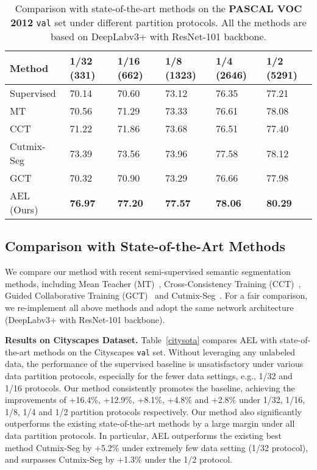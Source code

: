 \begin{table*}[t]
\renewcommand\arraystretch{1.1}
\begin{center}
\caption{Comparison with state-of-the-art methods on the \textbf{PASCAL VOC 2012} \texttt{val} set under different partition protocols. All the methods are based on DeepLabv3+ with ResNet-101 backbone.}
\label{vocsota}
\begin{tabularx}{14cm}{p{2.5cm}|X<{\centering}| X<{\centering}| X<{\centering} | X<{\centering}|X<{\centering}}
\toprule
Method & 1/32 (331) & 1/16 (662) & 1/8 (1323) & 1/4 (2646) & 1/2 (5291)  \\
\midrule
Supervised  & 70.14 & 70.60 & 73.12 & 76.35 & 77.21\\
\midrule
MT~\cite{TarvainenV17}    & 70.56 & 71.29 & 73.33 & 76.61 & 78.08 \\
CCT~\cite{OualiHT20}    & 71.22 & 71.86 & 73.68 & 76.51 & 77.40 \\
Cutmix-Seg~\cite{FrenchLAMF20}   & 73.39 & 73.56 & 73.96 & 77.58 & 78.12 \\
GCT~\cite{KeQLYL20}      & 70.32 & 70.90 & 73.29 & 76.66 & 77.98 \\
\midrule
AEL (Ours)     & \textbf{76.97} & \textbf{77.20} & \textbf{77.57} &\textbf{78.06} & \textbf{80.29}\\
\bottomrule
\end{tabularx}
\end{center}
\end{table*}

\subsection{Comparison with State-of-the-Art Methods}
We compare our method with recent semi-supervised semantic segmentation methods, including Mean Teacher (MT)~\cite{TarvainenV17}, Cross-Consistency Training (CCT)~\cite{OualiHT20}, Guided Collaborative Training (GCT)~\cite{KeQLYL20} and Cutmix-Seg~\cite{FrenchLAMF20}.
For a fair comparison, we re-implement all above methods and adopt the same network architecture (DeepLabv3+ with ResNet-101 backbone). 

\textbf{Results on Cityscapes Dataset.}
Table~\ref{citysota} compares AEL with state-of-the-art methods on the Cityscapes \texttt{val} set. Without leveraging any unlabeled data, the performance of the supervised baseline is unsatisfactory under various data partition protocols, especially for the fewer data settings, e.g., 1/32 and 1/16 protocols. Our method consistently promotes the baseline, achieving the improvements of +16.4\%, +12.9\%, +8.1\%, +4.8\% and +2.8\% under 1/32, 1/16, 1/8, 1/4 and 1/2 partition protocols respectively. Our method also significantly outperforms the existing state-of-the-art methods by a large margin under all data partition protocols. In particular, AEL outperforms the existing best method Cutmix-Seg by +5.2\% under extremely few data setting (1/32 protocol), and surpasses Cutmix-Seg by +1.3\% under the 1/2 protocol. 


